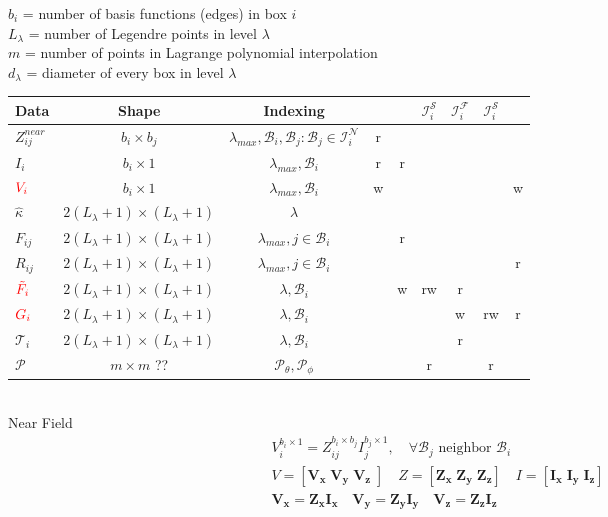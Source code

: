 \documentclass{report}
\begin{document}
\begin{table}
$b_i$ = number of  basis functions (edges) in box $i$\\
$L_\lambda$ = number of Legendre points in level $\lambda$\\
$m$ = number of points in Lagrange polynomial interpolation\\
$d_\lambda$ = diameter of every box in level $\lambda$\\
\begin{tabular}{lcc|c|c|c|c|c|c|}
Data & Shape & Indexing &&&$\mathcal{I}^\mathcal{S}_i$&$\mathcal{I}^\mathcal{F}_i$
&$\mathcal{I}^\mathcal{S}_i$&\\
\hline
$Z_{ij}^{near}$ & $b_i\times b_j$& $\lambda_{max}, \mathcal{B}_i,\mathcal{B}_j : \mathcal{B}_j \in \mathcal{I}^\mathcal{N}_i$ &r&&&&&\\
$I_i$ & $b_i\times 1$ & $\lambda_{max}, \mathcal{B}_i$&r&r&&&&\\
$\color{red}{V_i}$ & $b_i\times 1$ & $\lambda_{max}, \mathcal{B}_i$&w&&&&&w\\
$\hat{\kappa}$ & $2(L_\lambda+1)\times (L_\lambda+1)$ & $\lambda$&& &&&&\\
$F_{ij}$ & $2(L_\lambda+1)\times (L_\lambda+1)$ & $\lambda_{max},j \in \mathcal{B}_i$&&r&&&&\\
$R_{ij}$ & $2(L_\lambda+1)\times (L_\lambda+1)$ & $\lambda_{max},j \in \mathcal{B}_i$&&&&&&r\\
$\color{red}{\tilde{F_i}}$ & $2(L_\lambda+1)\times (L_\lambda+1)$ & $\lambda, \mathcal{B}_i$&&w&rw&r&&\\
$\color{red}{G_i}$ & $2(L_\lambda+1)\times (L_\lambda+1)$ & $\lambda, \mathcal{B}_i$&&&&w&rw&r\\
$\mathcal{T}_i$ &  $2(L_\lambda+1)\times (L_\lambda+1)$ & $\lambda, \mathcal{B}_i$&&&&r&&\\
$\mathcal{P}$ & $m\times m$ ??& $\mathcal{P}_\theta, \mathcal{P}_\phi$&&&r&&r&\\
\hline
\end{tabular}
\end{table}
~\newpage
~\\Near Field
\begin{equation}
\begin{aligned}
V_i^{b_i\times1}=Z_{ij}^{b_i\times b_j}I_j^{b_j\times1},\quad  \forall \mathcal{B}_j \text{ neighbor }\mathcal{B}_i	\\
V = \left[\mathbf{V_x} \;\mathbf{V_y}\;\mathbf{V_z}\;\right]\quad Z = \left[\mathbf{Z_x}  \;\mathbf{Z_y}\; \mathbf{Z_z}\right]
\quad I = \left[\mathbf{I_x}  \;\mathbf{I_y}\; \mathbf{I_z}\right]\\
\mathbf{V_x = Z_xI_x}\quad \mathbf{V_y = Z_yI_y}\quad \mathbf{V_z = Z_zI_z}
\end{aligned}
\end{equation}
\end{document}
